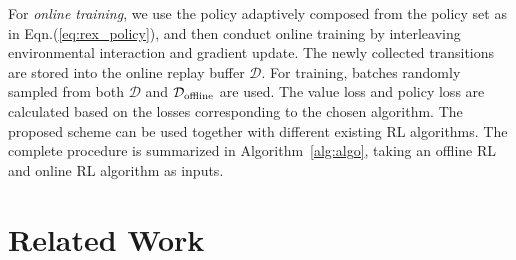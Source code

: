 \documentclass{article}
\begin{document}
For \emph{online training}, we use the policy adaptively composed from the policy set as in Eqn.(\ref{eq:rex_policy}),
and then conduct online training by interleaving environmental interaction and
gradient update.
The newly collected transitions are stored into the online replay buffer $\mathcal{D}$.
For training, batches randomly sampled from both $\mathcal{D}$ and $\mathcal{D}_{\rm offline}$
are used.
The value loss and policy loss are calculated based on the losses corresponding to the chosen algorithm.
The proposed scheme can be used together with  different existing RL algorithms.
The complete procedure is summarized in Algorithm~\ref{alg:algo}, taking an offline RL and online RL algorithm as inputs.





\vspace{-0.2in}
\section{Related Work}
\vspace{-0.05in}
\end{document}
